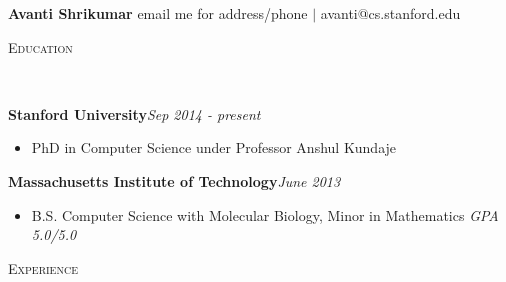 \documentclass{article}
\newenvironment{changemargin}[2]{%
  \begin{list}{}{%
    \setlength{\topsep}{0pt}%
    \setlength{\leftmargin}{#1}%
    \setlength{\rightmargin}{#2}%
    \setlength{\listparindent}{\parindent}%
    \setlength{\itemindent}{\parindent}%
    \setlength{\parsep}{\parskip}%
  }%
  \item[]}{\end{list}
}
\newcommand{\lineover}{
	\begin{changemargin}{-0.05in}{-0.05in}
		\vspace*{-8pt}
		\hrulefill \\
		\vspace*{-2pt}
	\end{changemargin}
}
\newcommand{\header}[1]{
	\begin{changemargin}{-0.5in}{-0.5in}
		\scshape{#1}\\
  	\lineover
	\end{changemargin}
}
\newenvironment{body} {
	\vspace*{-16pt}
	\begin{changemargin}{-0.25in}{-0.5in}
  }	
	{\end{changemargin}
}
\begin{document}
\begin{changemargin}{-0.5in}{-0.5in} {\textbf{\Large Avanti Shrikumar}} \hfill \small{email me for address/phone $\vert$ avanti@cs.stanford.edu } \end{changemargin}
                                                                                                                                                           
\vspace*{.05in}

\header{Education}

\begin{body}
	\small{\vspace{17pt}
	\textbf{Stanford University}\hfill \emph{Sep 2014 - present} \\
	\begin{itemize}
	   \item PhD in Computer Science under Professor Anshul Kundaje \\
	\end{itemize}
	\textbf{Massachusetts Institute of Technology}\hfill \emph{June 2013} \\
	\begin{itemize}
	   \item B.S. Computer Science with Molecular Biology, Minor in Mathematics \hfill \emph{GPA 5.0/5.0} \\
	\end{itemize}}
\end{body}


\header{Experience}
\end{document}
